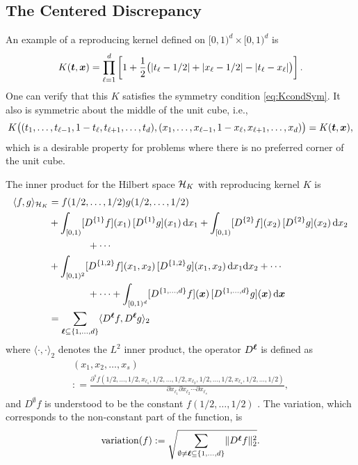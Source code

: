 \documentclass{svproc}
\begin{document}
\subsection{The Centered Discrepancy}
An example of a reproducing kernel defined on $[0,1)^d \times [0,1)^d$ is
\begin{equation} \label{eq:ctrkernel}
	K({\boldsymbol{t}},{\boldsymbol{x}}) = \prod_{\ell = 1}^d \left[ 1 + \frac 12 \bigl ( \lvert t_\ell - 1/2 \rvert + \lvert x_\ell - 1/2 \rvert - \lvert t_\ell - x_\ell \rvert \bigr ) \right] .
\end{equation}
One can verify that this $K$ satisfies the symmetry condition \eqref{eq:KcondSym}.  It also is symmetric about the middle of the unit cube, i.e.,
\begin{equation*}
	K\bigl((t_1,\ldots, t_{\ell-1}, 1 - t_\ell,  t_{\ell+1}, \ldots, t_d),
	(x_1,\ldots, x_{\ell-1}, 1 - x_\ell,  x_{\ell+1}, \ldots, x_d)
	\bigr) =
	K({\boldsymbol{t}},{\boldsymbol{x}}),
\end{equation*}
which is a desirable property for problems where there is no preferred corner of the unit cube.

The inner product for the Hilbert space ${\mathcal{H}}_K$ with reproducing kernel $K$ is
\begin{align}
	\langle f, g \rangle_{{\mathcal{H}}_K} &= f(1/2, \ldots, 1/2) g(1/2, \ldots, 1/2) \nonumber
	\\
	&
	+ \int_{[0,1)} [D^{\{1\}}f](x_1) \, [D^{\{1\}}g](x_1)\, \mathrm{d} x_1
	+ \int_{[0,1)} [D^{\{2\}}f](x_2) \, [D^{\{2\}}g](x_2)\, \mathrm{d} x_2 \nonumber \\
	& \qquad \qquad + \cdots \nonumber\\
	&
	+ \int_{[0,1)^2} [D^{{\{1,2\}}}f](x_1,x_2) \, [D^{\{1,2\}}g](x_1,x_2)\, \mathrm{d} x_1 \mathrm{d} x_2 + \cdots \nonumber \\
	&  \qquad \qquad + \cdots + \int_{[0,1)^d} [D^{\{1,\ldots, d\}}f]({\boldsymbol{x}}) \, [D^{\{1,\ldots, d\}}g]({\boldsymbol{x}}) \, \mathrm{d} {\boldsymbol{x}} \nonumber \\
	& = \sum_{{\boldsymbol{\ell}} \subseteq \{1, \ldots, d\}} \langle D^{{\boldsymbol{\ell}}}f, D^{{\boldsymbol{\ell}}}g \rangle_2
\end{align}
where $\langle \cdot,\cdot \rangle_2$ denotes the $L^2$ inner product, the operator $D^{{\boldsymbol{\ell}}}$ is defined as
\begin{multline*}
	[D^{\{\ell_1, \ell_2, \ldots, \ell_s\} }f](x_1, x_2, \ldots, x_s) \\
	: = \frac{\partial^s f(1/2,\ldots, 1/2, x_{\ell_1}, 1/2, \ldots, 1/2, x_{\ell_2}, 1/2, \ldots, 1/2, x_{\ell_s}, 1/2, \ldots, 1/2)}{\partial x_{\ell_1} \partial x_{\ell_2} \cdots \partial x_{\ell_s}},
\end{multline*}
and $D^{\emptyset}f$ is understood to be the constant $f(1/2, \ldots, 1/2)$ \cite{Hic97a}.  The variation, which corresponds to the non-constant part of the function, is
\begin{equation*}
		\text{variation}(f) := \sqrt{\sum_{\emptyset \ne {\boldsymbol{\ell}} \subseteq \{1, \ldots, d\}} \lVert D^{{\boldsymbol{\ell}}}f\rVert_2^2}.
\end{equation*}
\end{document}
